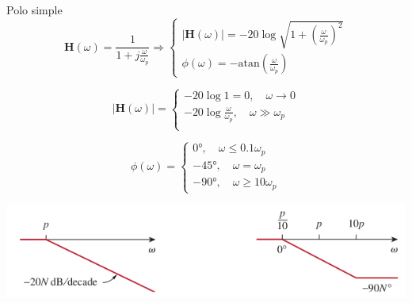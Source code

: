 \documentclass[xcolor={usenames,svgnames,dvipsnames}]{beamer}
\newcommand{\fasor}[1]{\mathbf{#1}(\omega)}
\newcommand{\atan}{\mathrm{atan}}
\begin{document}
\begin{frame}[label={sec:orgd8a55ea}]{Polo simple}
\[
  \fasor{H} = \frac{1}{1 + j\frac{\omega}{\omega_p}} \Rightarrow
  \begin{cases}
    |\fasor{H}| =  - 20 \log \sqrt{1 + \left(\frac{\omega}{\omega_p}\right)^2}\\
    \phi(\omega) = - \atan(\frac{\omega}{\omega_p}) 
  \end{cases}
\]

\[
  |\fasor{H}| = 
  \begin{cases}
  - 20 \log 1 = 0, \quad \omega \to 0\\
  - 20 \log \frac{\omega}{\omega_p}, \quad \omega \gg \omega_p\\
  \end{cases}
\]

\[
  \phi(\omega) = 
  \begin{cases}
    \ang{0},\quad \omega \leq 0.1\omega_p\\
    - \ang{45}, \quad \omega = \omega_p\\
    - \ang{90}, \quad \omega \geq 10 \omega_p
  \end{cases}
\]


\begin{center}
\includegraphics[width=.9\linewidth]{../figs/BodePoloSimple.pdf}
\end{center}
\end{frame}
\end{document}
